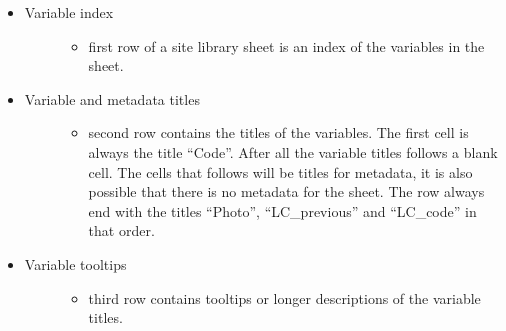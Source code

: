 \documentclass[letterpaper,10pt,english]{sphinxmanual}
\begin{document}
\begin{itemize}
\begin{description}
\end{description}

\item {} \begin{description}
\item[{Variable index}] \leavevmode\begin{itemize}
\item {} 
first row of a site library sheet is an index of the variables in the sheet.

\end{itemize}

\end{description}

\item {} \begin{description}
\item[{Variable and metadata titles}] \leavevmode\begin{itemize}
\item {} 
second row contains the titles of the variables. The first cell is always the title “Code”. After all the variable titles follows a blank cell. The cells that follows will be titles for metadata, it is also possible that there is no metadata for the sheet. The row always end with the titles “Photo”, “LC\_previous” and “LC\_code” in that order.

\end{itemize}

\end{description}

\item {} \begin{description}
\item[{Variable tooltips}] \leavevmode\begin{itemize}
\item {} 
third row contains tooltips or longer descriptions of the variable titles.

\end{itemize}

\end{description}


\end{itemize}
\end{document}
